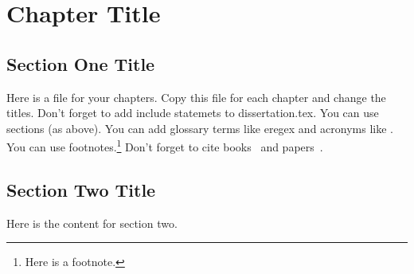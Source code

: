  
\chapter{Chapter Title}
\resetfootnote %

\section{Section One Title}

Here is a file for your chapters.  Copy this file for each chapter 
and change the titles.  Don't forget to add include statemets to 
dissertation.tex.  
You can use sections (as above).  
You can add glossary terms like \gls{eregex} and acronyms like .
You can use footnotes.\footnote{Here is a footnote.}
Don't forget to cite books~\cite{Sipser} and papers~\cite{CarleNarendran}.

\section{Section Two Title}

Here is the content for section two.
